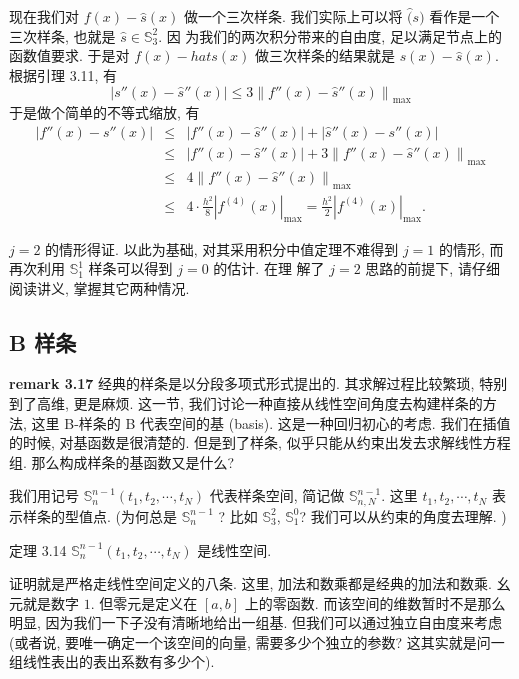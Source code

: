 \documentclass[a4paper]{ctexart}
\begin{document}
现在我们对 $f(x) - \hat{s}(x)$ 做一个三次样条. 我们实际上可以将
$\hat(s)$ 看作是一个三次样条, 也就是 $\hat{s} \in \mathbb{S}_3^2$. 因
为我们的两次积分带来的自由度, 足以满足节点上的函数值要求. 于是对 $f(x)
- hat{s}(x)$ 做三次样条的结果就是 $s(x) - \hat{s}(x)$. 根据引理 3.11, 有
$$
\left|s''(x) - \hat{s}''(x)\right| \leq 3 \left\|f''(x) - \hat{s}''(x)\right\|_{\max}
$$
于是做个简单的不等式缩放, 有
$$
\begin{array}{rcl}
  \left|f''(x) - s''(x)\right| &\leq& \left|f''(x) -
  \hat{s}''(x)\right| + \left|\hat{s}''(x) - s''(x)\right| \\ &\leq&
  \left|f''(x) - \hat{s}''(x)\right| + 3 \left\|f''(x) -
  \hat{s}''(x)\right\|_{\max} \\ &\leq& 4 \left\|f''(x) -
  \hat{s}''(x)\right\|_{\max} \\ &\leq& 4 \cdot \frac{h^2}{8}
  \left|f^{(4)}(x)\right|_{\max} = \frac{h^2}{2}
  \left|f^{(4)}(x)\right|_{\max}.
\end{array}
$$

$j = 2$ 的情形得证. 以此为基础, 对其采用积分中值定理不难得到 $j = 1$
的情形, 而再次利用 $\mathbb{S}_1^1$ 样条可以得到 $j = 0$ 的估计. 在理
解了 $j = 2$ 思路的前提下, 请仔细阅读讲义, 掌握其它两种情况.

\subsection{B 样条}
{\bf remark 3.17} 经典的样条是以分段多项式形式提出的. 
其求解过程比较繁琐, 特别到了高维, 更是麻烦. 这一节, 
我们讨论一种直接从线性空间角度去构建样条的方法, 
这里 B-样条的 B 代表空间的基 (basis). 这是一种回归初心的考虑. 
我们在插值的时候, 对基函数是很清楚的. 但是到了样条, 似乎只能从约束出发去求解线性方程组. 
那么构成样条的基函数又是什么? 

我们用记号 $\mathbb{S}_{n}^{n - 1}(t_1, t_2, \cdots, t_N)$ 代表样条空间, 
简记做 $\mathbb{S}_{n, N}^{n - 1}$. 这里 $t_1, t_2, \cdots, t_N$ 表示样条的型值点.
(为何总是 $\mathbb{S}_{n}^{n - 1}$ ? 比如 $\mathbb{S}_{3}^{2}$, 
$\mathbb{S}_{1}^{0}$? 我们可以从约束的角度去理解. )

定理 3.14 $\mathbb{S}_{n}^{n - 1}(t_1, t_2, \cdots, t_N)$ 是线性空间.

证明就是严格走线性空间定义的八条. 这里, 加法和数乘都是经典的加法和数乘.
幺元就是数字 $1$. 但零元是定义在 $[a, b]$ 上的零函数. 
而该空间的维数暂时不是那么明显, 因为我们一下子没有清晰地给出一组基. 
但我们可以通过独立自由度来考虑(或者说, 要唯一确定一个该空间的向量, 
需要多少个独立的参数? 这其实就是问一组线性表出的表出系数有多少个). 
\end{document}
